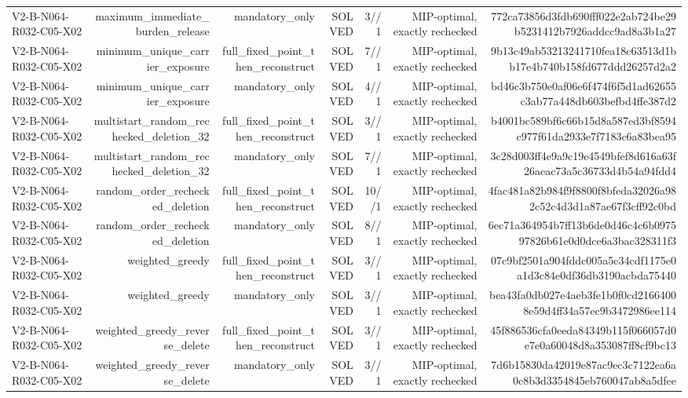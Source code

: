 {\begin{longtable}{lrrrrrr}
V2-B-N064-R032-C05-X02 & maximum\_immediate\_burden\_release & mandatory\_only & SOLVED & 3//1 & MIP-optimal, exactly rechecked & 772ca73856d3fdb690fff022e2ab724be29b5231412b7926addcc9ad8a3b1a27 \\
V2-B-N064-R032-C05-X02 & minimum\_unique\_carrier\_exposure & full\_fixed\_point\_then\_reconstruct & SOLVED & 7//1 & MIP-optimal, exactly rechecked & 9b13c49ab53213241710fea18c63513d1bb17e4b740b158fd677ddd26257d2a2 \\
V2-B-N064-R032-C05-X02 & minimum\_unique\_carrier\_exposure & mandatory\_only & SOLVED & 4//1 & MIP-optimal, exactly rechecked & bd46c3b750e0af06e6f474f6f5d1ad62655c3ab77a448db603befbd4ffe387d2 \\
V2-B-N064-R032-C05-X02 & multistart\_random\_rechecked\_deletion\_32 & full\_fixed\_point\_then\_reconstruct & SOLVED & 3//1 & MIP-optimal, exactly rechecked & b4001bc589bf6c66b15d8a587ed3bf8594c977f61da2933e7f7183c6a83bea95 \\
V2-B-N064-R032-C05-X02 & multistart\_random\_rechecked\_deletion\_32 & mandatory\_only & SOLVED & 7//1 & MIP-optimal, exactly rechecked & 3c28d003ff4e9a9c19e4549bfef8d616a63f26aeac73a5c36733d4b54a94fdd4 \\
V2-B-N064-R032-C05-X02 & random\_order\_rechecked\_deletion & full\_fixed\_point\_then\_reconstruct & SOLVED & 10//1 & MIP-optimal, exactly rechecked & 4fac481a82b984f9f8800f8bfeda32026a982c52c4d3d1a87ae67f3cff92c0bd \\
V2-B-N064-R032-C05-X02 & random\_order\_rechecked\_deletion & mandatory\_only & SOLVED & 8//1 & MIP-optimal, exactly rechecked & 6ec71a364954b7ff13b6de0d46c4c6b097597826b61e0d0dce6a3bac328311f3 \\
V2-B-N064-R032-C05-X02 & weighted\_greedy & full\_fixed\_point\_then\_reconstruct & SOLVED & 3//1 & MIP-optimal, exactly rechecked & 07c9bf2501a904fddc005a5c34cdf1175e0a1d3c84e0df36db3190acbda75440 \\
V2-B-N064-R032-C05-X02 & weighted\_greedy & mandatory\_only & SOLVED & 3//1 & MIP-optimal, exactly rechecked & bea43fa0db027e4aeb3fe1b0f0cd21664008e59d4ff34a57ec9b3472986ee114 \\
V2-B-N064-R032-C05-X02 & weighted\_greedy\_reverse\_delete & full\_fixed\_point\_then\_reconstruct & SOLVED & 3//1 & MIP-optimal, exactly rechecked & 45f886536cfa0eeda84349b115f066057d0e7e0a60048d8a353087ff8cf9bc13 \\
V2-B-N064-R032-C05-X02 & weighted\_greedy\_reverse\_delete & mandatory\_only & SOLVED & 3//1 & MIP-optimal, exactly rechecked & 7d6b15830da42019e87ac9ec3c7122ea6a0c8b3d3354845eb760047ab8a5dfee \\

\end{longtable}}

